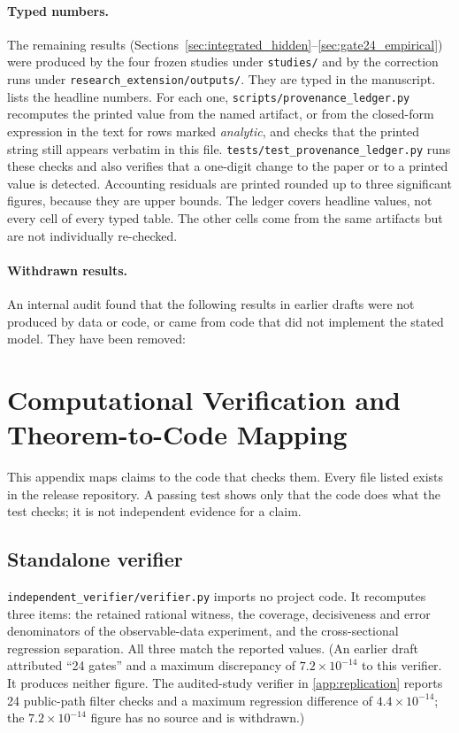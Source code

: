 \documentclass[10pt,twocolumn,letterpaper]{article}
\theoremstyle{definition}
\theoremstyle{remark}
\begin{document}
\paragraph{Typed numbers.} The remaining results (Sections~\ref{sec:integrated_hidden}--\ref{sec:gate24_empirical}) were produced by the four frozen studies under \texttt{studies/} and by the correction runs under \texttt{research\_extension/outputs/}. They are typed in the manuscript.  lists the headline numbers. For each one, \texttt{scripts/provenance\_ledger.py} recomputes the printed value from the named artifact, or from the closed-form expression in the text for rows marked \emph{analytic}, and checks that the printed string still appears verbatim in this file. \texttt{tests/test\_provenance\_ledger.py} runs these checks and also verifies that a one-digit change to the paper or to a printed value is detected. Accounting residuals are printed rounded up to three significant figures, because they are upper bounds. The ledger covers headline values, not every cell of every typed table. The other cells come from the same artifacts but are not individually re-checked.



\paragraph{Withdrawn results.} An internal audit found that the following results in earlier drafts were not produced by data or code, or came from code that did not implement the stated model. They have been removed:


\clearpage
\section{Computational Verification and Theorem-to-Code Mapping}
\label{app:computational_verification}
This appendix maps claims to the code that checks them. Every file listed exists in the release repository. A passing test shows only that the code does what the test checks; it is not independent evidence for a claim.



\subsection{Standalone verifier}
\nolinkurl{independent_verifier/verifier.py} imports no project code. It recomputes three items: the retained rational witness, the coverage, decisiveness and error denominators of the observable-data experiment, and the cross-sectional regression separation. All three match the reported values. (An earlier draft attributed ``24 gates'' and a maximum discrepancy of $7.2\times10^{-14}$ to this verifier. It produces neither figure. The audited-study verifier in \cref{app:replication} reports 24 public-path filter checks and a maximum regression difference of $4.4\times10^{-14}$; the $7.2\times10^{-14}$ figure has no source and is withdrawn.)
\end{document}
